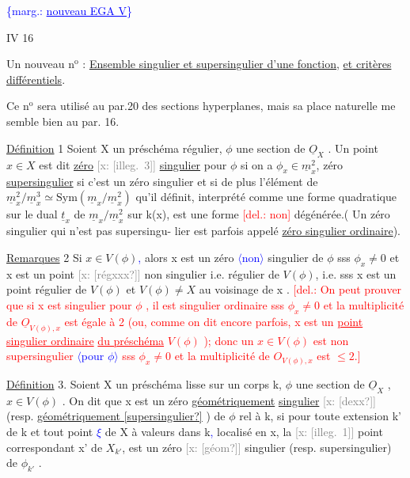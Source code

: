 \documentclass[11pt]{article}
\newcommand{\scanpage}[1]{\par\bigskip\noindent{\small\sffamily[scan #1]}\par}
\newcommand{\mspage}[1]{{\small\sffamily[p.\,#1]}}
\newcommand{\hand}[1]{\textcolor{blue}{#1}}
\newcommand{\inserted}[2][]{\textcolor{blue}{$\langle$#2$\rangle$}}
\newcommand{\margin}[1]{\textcolor{blue}{\{\textsf{marg.:} #1\}}}
\newcommand{\deleted}[1]{\textcolor{red}{[\textsf{del.:} #1]}}
\newcommand{\xout}[1]{\textcolor{gray}{[\textsf{x:} #1]}}
\newcommand{\uline}[1]{\underline{#1}}
\newcommand{\unsure}[1]{[#1?]}
\newcommand{\illegible}[1]{[\textsf{illeg.\ #1}]}
\begin{document}
\mspage{\hand{4}}

\clearpage
\scanpage{25/140}
\margin{\uline{nouveau EGA V}}

IV 16

Un nouveau n$^{\text{o}}$ : \uline{Ensemble singulier et supersingulier d'une fonction},
\uline{et critères différentiels}.

Ce n$^{\text{o}}$ sera utilisé au par.20 des sections hyperplanes, mais sa
place naturelle me semble bien au par. 16.

\uline{Définition} 1 Soient X un préschéma régulier, $\phi$ une section de $\underline{O}_X$ . Un
point $x \in X$ est dit \uline{zéro} \xout{\illegible{3}} \uline{singulier} pour $\phi$
si on a $\phi_x \in \underline{m}_x^2$, zéro \uline{supersingulier} si c'est un zéro singulier
et si de plus l'élément de $\underline{m}_x^2/\underline{m}_x^3 \simeq \mathrm{Sym}(\underline{m}_x/\underline{m}_x^2)$ qu'il définit,
interprété comme une forme quadratique sur le dual $\underline{t}_x$ de $\underline{m}_x/\underline{m}_x^2$ sur k(x),
est une forme \deleted{non} dégénérée.( Un zéro singulier qui n'est pas supersingu-%
lier est parfois appelé \uline{zéro singulier ordinaire}).

\uline{Remarques} 2 Si $x \in V(\phi)$\hand{,} alors x est un zéro \inserted{non} singulier de $\phi$ sss
$\phi_x \neq 0$ et x est un point \xout{\unsure{régxxx}} non singulier i.e. régulier de $V(\phi)$,
i.e. sss x est un point régulier de $V(\phi)$ et $V(\phi) \neq X$ au voisinage de
x . \deleted{On peut prouver que si x est singulier pour $\phi$ , il est singulier
ordinaire sss $\phi_x \neq 0$ et la multiplicité de $\underline{O}_{V(\phi),x}$ est égale à 2
(ou, comme on dit encore parfois, x est un \uline{point singulier ordinaire}
\uline{du préschéma} $V(\phi)$ ); donc un $x \in V(\phi)$ est non supersingulier \inserted{pour $\phi$} sss
$\phi_x \neq 0$ et la multiplicité de $O_{V(\phi),x}$ est $\leq 2$.}

\uline{Définition} 3. Soient X un préschéma lisse sur un corps k, $\phi$ une
section de $\underline{O}_X$ , $x \in V(\phi)$ . On dit que x est un zéro \uline{géométriquement}
\uline{singulier} \xout{\unsure{dexx}} (resp. \uline{géométriquement \unsure{supersingulier}} ) de $\phi$ rel à k,
si pour toute extension k' de k et tout point \hand{$\xi$} de X à valeurs dans
k\hand{,} localisé en x, la \xout{\illegible{1}} point correspondant x' de $X_{k'}$, est un zéro
\xout{\unsure{géom}} singulier (resp. supersingulier) de $\phi_{k'}$ .

\mspage{140}
\end{document}
